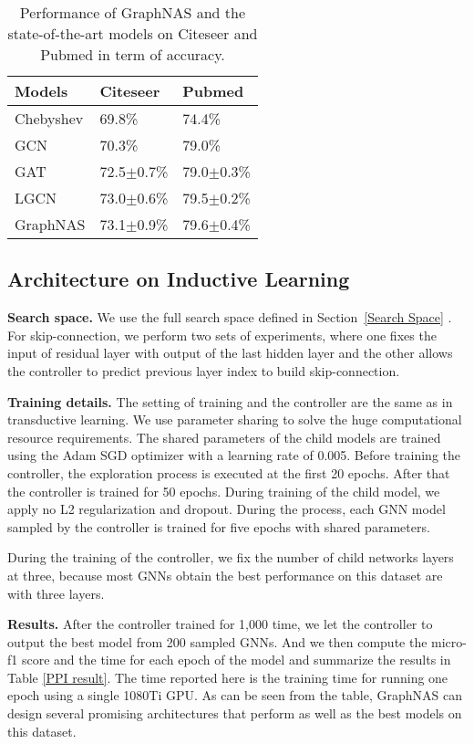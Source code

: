 \documentclass{article}
\begin{document}
\begin{table}[]
	\caption{Performance of GraphNAS and the state-of-the-art models on Citeseer and Pubmed in term of accuracy.}
	\label{other_citation}
	\begin{tabular}{l|l|l}
		\hline
		Models    &    Citeseer     & Pubmed       \\ \hline
		Chebyshev &        69.8\%       & 74.4\%       \\
		GCN       &  70.3\%       & 79.0\%       \\
		GAT       &     72.5$\pm$0.7\%         &      79.0$\pm$0.3\%        \\
		LGCN      & 73.0$\pm$0.6\% & 79.5$\pm$0.2\% \\ \hline
		GraphNAS  &      73.1$\pm$0.9\%     & 79.6$\pm$0.4\%      \\ \hline
	\end{tabular}
\end{table}

\subsection{Architecture on Inductive Learning}

\textbf{Search space.} 
We use the full search space defined in Section~\ref{Search Space} . For skip-connection, we perform two sets of experiments, where one fixes the input of residual layer with output of the last hidden layer and the other allows the controller to predict previous layer index to build skip-connection.


\textbf{Training details.}
The setting of training  and the controller  are the same as  in transductive learning.
We use parameter sharing to solve the huge computational resource requirements.
The shared parameters of the child models are trained using the Adam SGD  optimizer with a learning rate of 0.005. 
Before training the controller, the exploration process is executed at the first 20 epochs. After that the controller is trained for 50 epochs.
During training of the child model, we apply no L2 regularization and dropout. During the  process,   each GNN  model  sampled by the controller is trained for five epochs with shared parameters. 

During the training of the controller, we fix the number of child networks layers at three, because most  GNNs obtain the best performance on this dataset are with three layers.



\textbf{Results.}
After the controller trained for 1,000 time, we let the controller to output the best model from 200 sampled GNNs. And we then compute the  micro-f1 score and the time for each epoch of the model and summarize the results in Table \ref{PPI result}. The time reported here is the training time for running one epoch using a single 1080Ti GPU. As can be seen from the table, GraphNAS can design several promising architectures that perform as well as the best models on this dataset.
\end{document}
